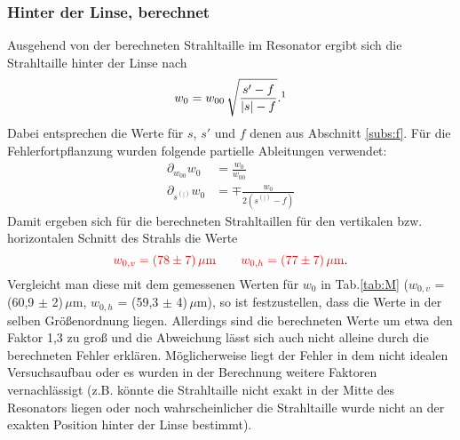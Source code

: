 \subsubsection*{Hinter der Linse, berechnet}
Ausgehend von der berechneten Strahltaille im Resonator ergibt sich die Strahltaille hinter der Linse nach 
\begin{equation*}
    w_0 = w_{00}\,\sqrt{\frac{s'-f}{|s|-f}}. \mathrm{\footnotemark}
\end{equation*}
Dabei entsprechen die Werte für $s$, $s'$ und $f$ denen aus Abschnitt \ref{subs:f}. Für die Fehlerfortpflanzung wurden folgende partielle Ableitungen verwendet: 
\begin{align*}
    \partial_{w_{00}}w_0 &= \frac{w_0}{w_{00}}\\
    \partial_{s^{(|)}}w_{0} &= \mp \frac{w_0}{2(s^{(|)}-f)}
\end{align*}
Damit ergeben sich für die berechneten Strahltaillen für den vertikalen bzw. horizontalen Schnitt des Strahls die Werte 
\begin{equation*}
    \textcolor{red}{w_{0,v} = (78 \pm 7)\,\mu\mathrm{m} \qquad w_{0,h} = (77 \pm 7)\,\mu\mathrm{m}}.
\end{equation*}
Vergleicht man diese mit dem gemessenen Werten für $w_0$ in Tab.\ref{tab:M} ($w_{0,v}$ = (60,9  $\pm$ 2)\,$\mu$m, $w_{0,h}$ = (59,3  $\pm$ 4)\,$\mu$m), so ist festzustellen, 
dass die Werte in der selben Größenordnung liegen. Allerdings sind die berechneten Werte um etwa den Faktor 1,3 zu groß und die Abweichung lässt sich auch nicht alleine durch 
die berechneten Fehler erklären. Möglicherweise liegt der Fehler in dem nicht idealen Versuchsaufbau oder es wurden in der Berechnung weitere Faktoren vernachlässigt (z.B. 
könnte die Strahltaille nicht exakt in der Mitte des Resonators liegen oder noch wahrscheinlicher die Strahltaille wurde nicht an der exakten Position hinter der Linse 
bestimmt).

